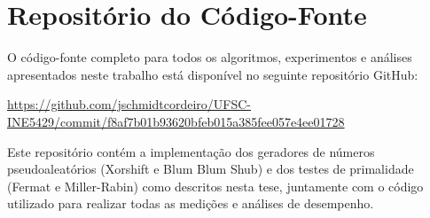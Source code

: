 \chapter{Repositório do Código-Fonte}
\label{apx:code-repository}

O código-fonte completo para todos os algoritmos, experimentos e análises apresentados neste trabalho está disponível no seguinte repositório GitHub:

\begin{center}
    \url{https://github.com/jschmidtcordeiro/UFSC-INE5429/commit/f8af7b01b93620bfeb015a385fee057e4ee01728}
\end{center}

Este repositório contém a implementação dos geradores de números pseudoaleatórios (Xorshift e Blum Blum Shub) e dos testes de primalidade (Fermat e Miller-Rabin) como descritos nesta tese, juntamente com o código utilizado para realizar todas as medições e análises de desempenho.

